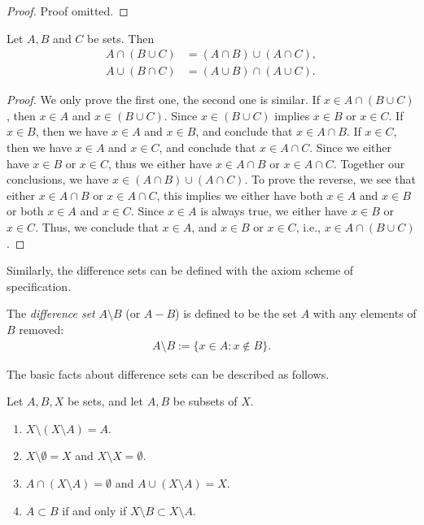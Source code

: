 \begin{proof}
    Proof omitted.
\end{proof}

\begin{proposition}
    Let $A, B$ and $C$ be sets. Then
        \begin{align*}
            A \cap (B \cup C) &= (A \cap B) \cup (A \cap C),\\
            A \cup (B \cap C) &= (A \cup B) \cap (A \cup C).
        \end{align*}
\end{proposition}

\begin{proof}
    We only prove the first one, the second one is similar. If $x \in A \cap (B \cup C)$, then $x \in A$ and $x \in (B \cup C)$. Since $x \in (B \cup C)$ implies $x \in B$ or $x \in C$. If $x \in B$, then we have $x \in A$ and $x \in B$, and conclude that $x \in A \cap B$. If $x \in C$, then we have $x \in A$ and $x \in C$, and conclude that $x \in A \cap C$. Since we either have $x \in B$ or $x \in C$, thus we either have $x \in A \cap B$ or $x \in A \cap C$. Together our conclusions, we have $x \in (A \cap B) \cup (A \cap C)$. To prove the reverse, we see that either $x \in A \cap B$ or $x \in A \cap C$, this implies we either have both $x \in A$ and $x \in B$ or both $x \in A$ and $x \in C$. Since $x \in A$ is always true, we either have $x \in B$ or $x \in C$. Thus, we conclude that $x \in A$, and $x \in B$ or $x \in C$, i.e., $x \in A \cap (B \cup C)$.
\end{proof}

Similarly, the difference sets can be defined with the axiom scheme of specification.

\begin{definition}
    The \emph{difference set} $A \setminus B$ (or $A - B$) is defined to be the set $A$ with any elements of $B$ removed:
    \begin{align*}
        A \setminus B := \{x \in A : x \notin B\}.
    \end{align*}
\end{definition}

The basic facts about difference sets can be described as follows.

\begin{proposition}
    Let $A, B, X$ be sets, and let $A, B$ be subsets of $X$.
    \begin{enumerate}
        \item $X \setminus (X \setminus A) = A$.
        \item $X \setminus \emptyset = X$ and $X \setminus X = \emptyset$.
        \item $A \cap (X \setminus A) = \emptyset$ and $A \cup (X \setminus A) = X$.
        \item $A \subset B$ if and only if $X \setminus B \subset X \setminus A$.
    \end{enumerate}
\end{proposition}

